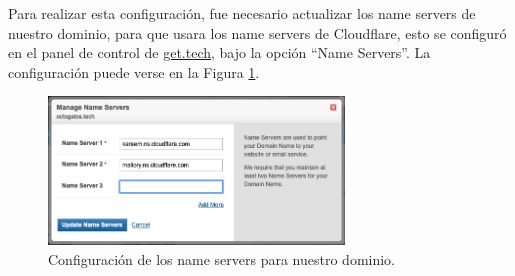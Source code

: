 \documentclass{article}
\begin{document}
Para realizar esta configuraci\'on, fue necesario
actualizar los name servers de nuestro dominio,
para que usara los name servers de Cloudflare,
esto se configur\'o en el panel de control de
\href{https://get.tech}{get.tech}, bajo la opci\'on
``Name Servers''.   La configuraci\'on puede
verse en la Figura \ref{fig:nameServers}.
\begin{figure}[H]
  \centering
  \includegraphics[width=0.7\textwidth]{DNS/nameServers}
  \caption{Configuraci\'on de los name servers para
           nuestro dominio.}
  \label{fig:nameServers}
\end{figure}
\end{document}
